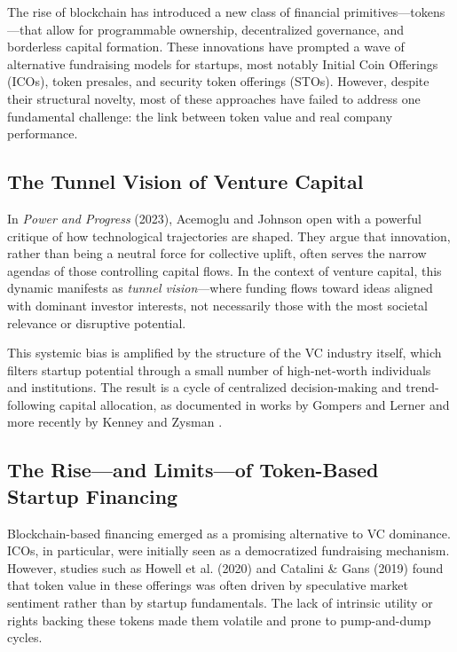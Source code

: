 \documentclass[conference]{IEEEtran}
\begin{document}
The rise of blockchain has introduced a new class of financial primitives—tokens—that allow for programmable ownership, decentralized governance, and borderless capital formation. These innovations have prompted a wave of alternative fundraising models for startups, most notably Initial Coin Offerings (ICOs), token presales, and security token offerings (STOs). However, despite their structural novelty, most of these approaches have failed to address one fundamental challenge: the link between token value and real company performance.

\subsection{The Tunnel Vision of Venture Capital}

In \textit{Power and Progress} (2023), Acemoglu and Johnson open with a powerful critique of how technological trajectories are shaped. They argue that innovation, rather than being a neutral force for collective uplift, often serves the narrow agendas of those controlling capital flows. In the context of venture capital, this dynamic manifests as \textit{tunnel vision}—where funding flows toward ideas aligned with dominant investor interests, not necessarily those with the most societal relevance or disruptive potential.

This systemic bias is amplified by the structure of the VC industry itself, which filters startup potential through a small number of high-net-worth individuals and institutions. The result is a cycle of centralized decision-making and trend-following capital allocation, as documented in works by Gompers and Lerner \cite{gompers2004venture} and more recently by Kenney and Zysman \cite{kenney2019platform}.

\subsection{The Rise—and Limits—of Token-Based Startup Financing}

Blockchain-based financing emerged as a promising alternative to VC dominance. ICOs, in particular, were initially seen as a democratized fundraising mechanism. However, studies such as Howell et al. (2020) \cite{howell2020initial} and Catalini \& Gans (2019) \cite{catalini2019some} found that token value in these offerings was often driven by speculative market sentiment rather than by startup fundamentals. The lack of intrinsic utility or rights backing these tokens made them volatile and prone to pump-and-dump cycles.
\end{document}
